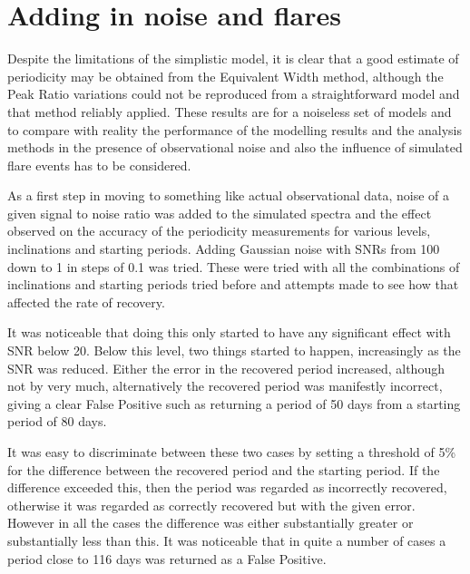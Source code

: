 \section{Adding in noise and flares}
\protect\label{section:addflares}

Despite the limitations of the simplistic model, it is clear that a good estimate of periodicity may be obtained from
the Equivalent Width method, although the Peak Ratio variations could not be reproduced from a straightforward model and that method reliably applied.
These results are for a noiseless set of models and to compare with reality the performance of the modelling results and
the analysis methods in the presence of observational noise and also the influence of simulated flare events has to be
considered.

As a first step in moving to something like actual observational data, noise of a given signal to noise ratio was added
to the simulated spectra and the effect observed on the accuracy of the periodicity measurements for various levels,
inclinations and starting periods. Adding Gaussian noise with SNRs from 100 down to 1 in steps of 0.1 was tried.
These were tried with all the combinations of inclinations and starting periods tried before and attempts made to see
how that affected the rate of recovery.

It was noticeable that doing this only started to have any significant effect with SNR below 20. Below this level, two
things started to happen, increasingly as the SNR was reduced. Either the error in the recovered period increased,
although not by very much, alternatively the recovered period was manifestly incorrect, giving a clear False Positive
such as returning a period of 50 days from a starting period of 80 days.

It was easy to discriminate between these two cases by setting a threshold of 5\% for the difference between the
recovered period and the starting period. If the difference exceeded this, then the period was regarded as incorrectly
recovered, otherwise it was regarded as correctly recovered but with the given error. However in all the cases the
difference was either substantially greater or substantially less than this. It was noticeable that in quite a number of
cases a period close to 116 days was returned as a False Positive.

